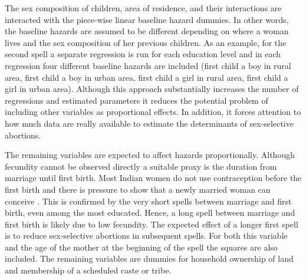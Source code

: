 \documentclass[12pt,letterpaper]{article}
\begin{document}
The sex composition of children, area of residence, and their interactions
are interacted with the piece-wise linear baseline hazard dummies.
In other words, the baseline hazards are assumed to be different depending on
where a woman lives and the sex composition of her previous children.
As an example, for the second spell a separate regression is
run for each education level and in each regression four different baseline hazards 
are included (first child a boy in rural area, first child a boy in urban area,
first child a girl in rural area, first child a girl in urban area).
Although this approach substantially increases the number of regressions and estimated parameters it
reduces the potential problem of including other variables as proportional effects.
In addition, it forces attention to how much data are really available to estimate
the determinants of sex-selective abortions.

The remaining variables are expected to affect hazards proportionally.
Although fecundity cannot be observed directly a suitable
proxy is the duration from marriage until first birth.
Most Indian women do not use contraception before the first birth
and there is pressure to show that a newly married woman can conceive \citep{dyson83,Sethuraman2007,Dommaraju2009}.
This is confirmed by the very short spells between marriage and first birth,
even among the most educated.
Hence, a long spell between marriage and first birth is likely due to low fecundity.
The expected effect of a longer first spell is to reduce sex-selective abortions in subsequent spells.
For both this variable and the age of the mother at the beginning of the spell the squares are also included.
The remaining variables are dummies for household ownership of land and membership
of a scheduled caste or tribe.
\end{document}
